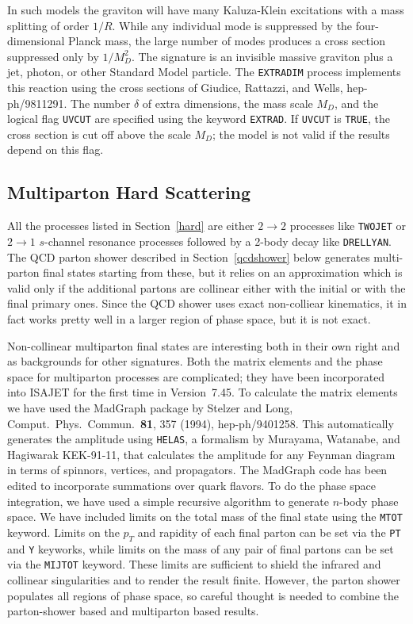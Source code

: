       In such models the graviton will have many Kaluza-Klein
excitations with a mass splitting of order $1/R$. While any individual
mode is suppressed by the four-dimensional Planck mass, the large number
of modes produces a cross section suppressed only by $1/M_D^2$. The
signature is an invisible massive graviton plus a jet, photon, or other
Standard Model particle. The \verb|EXTRADIM| process implements this
reaction using the cross sections of Giudice, Rattazzi, and Wells,
hep-ph/9811291. The number $\delta$ of extra dimensions, the mass scale
$M_D$, and the logical flag \verb|UVCUT| are specified using the keyword
\verb|EXTRAD|. If \verb|UVCUT| is \verb|TRUE|, the cross section is cut
off above the scale $M_D$; the model is not valid if the results depend
on this flag.

\subsection{Multiparton Hard Scattering}

      All the processes listed in Section~\ref{hard} are either $2\to2$
processes like \verb|TWOJET| or $2\to1$ $s$-channel resonance processes
followed by a 2-body decay like \verb|DRELLYAN|. The QCD parton shower
described in Section~\ref{qcdshower} below generates multi-parton final
states starting from these, but it relies on an approximation which is
valid only if the additional partons are collinear either with the
initial or with the final primary ones. Since the QCD shower uses exact
non-colliear kinematics, it in fact works pretty well in a larger region
of phase space, but it is not exact.

      Non-collinear multiparton final states are interesting both in
their own right and as backgrounds for other signatures. Both the matrix
elements and the phase space for multiparton processes are complicated;
they have been incorporated into ISAJET for the first time in
Version~7.45. To calculate the matrix elements we have used the MadGraph
package by Stelzer and Long, Comput.\ Phys.\ Commun.\ {\bf81}, 357
(1994), hep-ph/9401258. This automatically generates the amplitude using
\verb|HELAS|, a formalism by Murayama, Watanabe, and Hagiwarak
KEK-91-11, that calculates the amplitude for any Feynman diagram in
terms of spinnors, vertices, and propagators. The MadGraph code has been
edited to incorporate summations over quark flavors. To do the phase
space integration, we have used a simple recursive algorithm to generate
$n$-body phase space. We have included limits on the total mass of the
final state using the \verb|MTOT| keyword. Limits on the $p_T$ and
rapidity of each final parton can be set via the \verb|PT| and \verb|Y|
keyworks, while limits on the mass of any pair of final partons can be
set via the \verb|MIJTOT| keyword. These limits are sufficient to shield
the infrared and collinear singularities and to render the result
finite. However, the parton shower populates all regions of phase space,
so careful thought is needed to combine the parton-shower based and
multiparton based results.

